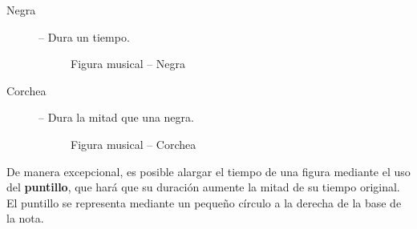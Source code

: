 \begin{description}
\item[Negra] -- Dura un tiempo.
\vspace{-0.1cm}
\begin{figure}[h!]
  \centering
  \caption{Figura musical -- Negra}
\end{figure}

\vspace{-0.35cm}

\item[Corchea] -- Dura la mitad que una negra.
\vspace{-0.1cm}
\begin{figure}[h!]
  \centering
  \caption{Figura musical -- Corchea}
\end{figure}
\end{description}

\vspace{-0.35cm}

De manera excepcional, es posible alargar el tiempo de una figura mediante el
uso del \textbf{puntillo}, que hará que su duración aumente la mitad de su
tiempo original. El puntillo se representa mediante un pequeño círculo a la
derecha de la base de la nota.

